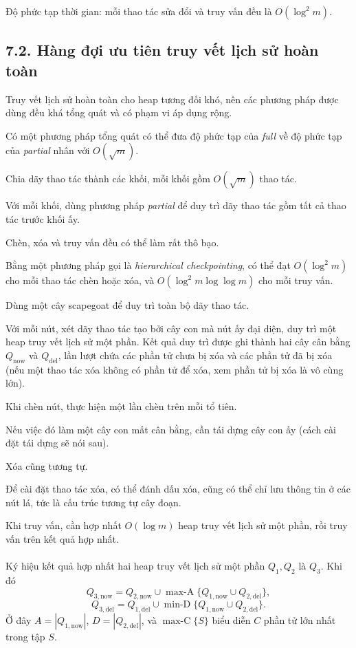 \documentclass[11pt]{article}
\begin{document}
Độ phức tạp thời gian: mỗi thao tác sửa đổi và truy vấn đều là
\(O(\log^2 m)\).

\subsection*{7.2. Hàng đợi ưu tiên truy vết lịch sử hoàn toàn}

Truy vết lịch sử hoàn toàn cho heap tương đối khó, nên các phương pháp được
dùng đều khá tổng quát và có phạm vi áp dụng rộng.

Có một phương pháp tổng quát có thể đưa độ phức tạp của \emph{full} về độ
phức tạp của \emph{partial} nhân với \(O(\sqrt m)\).

Chia dãy thao tác thành các khối, mỗi khối gồm \(O(\sqrt m)\) thao tác.

Với mỗi khối, dùng phương pháp \emph{partial} để duy trì dãy thao tác gồm tất
cả thao tác trước khối ấy.

Chèn, xóa và truy vấn đều có thể làm rất thô bạo.

Bằng một phương pháp gọi là \emph{hierarchical checkpointing}, có thể đạt
\(O(\log^2 m)\) cho mỗi thao tác chèn hoặc xóa, và
\(O(\log^2 m\log\log m)\) cho mỗi truy vấn.

Dùng một cây scapegoat để duy trì toàn bộ dãy thao tác.

Với mỗi nút, xét dãy thao tác tạo bởi cây con mà nút ấy đại diện, duy trì một
heap truy vết lịch sử một phần. Kết quả duy trì được ghi thành hai cây cân
bằng \(Q_{\mathrm{now}}\) và \(Q_{\mathrm{del}}\), lần lượt chứa các phần tử
chưa bị xóa và các phần tử đã bị xóa (nếu một thao tác xóa không có phần tử
để xóa, xem phần tử bị xóa là vô cùng lớn).

Khi chèn nút, thực hiện một lần chèn trên mỗi tổ tiên.

Nếu việc đó làm một cây con mất cân bằng, cần tái dựng cây con ấy (cách cài
đặt tái dựng sẽ nói sau).

Xóa cũng tương tự.

Để cài đặt thao tác xóa, có thể đánh dấu xóa, cũng có thể chỉ lưu thông tin ở
các nút lá, tức là cấu trúc tương tự cây đoạn.

Khi truy vấn, cần hợp nhất \(O(\log m)\) heap truy vết lịch sử một phần, rồi
truy vấn trên kết quả hợp nhất.

\paragraph{}
Ký hiệu kết quả hợp nhất hai heap truy vết lịch sử một phần \(Q_1,Q_2\) là
\(Q_3\). Khi đó
\[
Q_{3,\mathrm{now}}
= Q_{2,\mathrm{now}}
\cup \operatorname{max-A}\{Q_{1,\mathrm{now}}\cup Q_{2,\mathrm{del}}\},
\]
\[
Q_{3,\mathrm{del}}
= Q_{1,\mathrm{del}}
\cup \operatorname{min-D}\{Q_{1,\mathrm{now}}\cup Q_{2,\mathrm{del}}\}.
\]
Ở đây \(A=|Q_{1,\mathrm{now}}|\), \(D=|Q_{2,\mathrm{del}}|\), và
\(\operatorname{max-C}\{S\}\) biểu diễn \(C\) phần tử lớn nhất trong tập \(S\).
\end{document}
